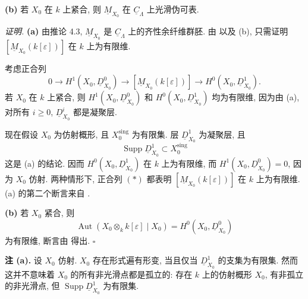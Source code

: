 \smallskip
\noindent\textbf{(b)}
若 $X_0$ 在 $k$ 上紧合, 则 $\underline M_{X_0}$ 在 $\underline C_\Lambda$ 上光滑伪可表.


\medskip
\noindent\textit{证明.}
\textbf{(a)} 由推论 4.3, $\underline M_{X_0}$ 是 $\underline C_\Lambda$ 上的齐性余纤维群胚. 由  以及 (b), 只需证明 $[\underline M_{X_0}(k[\varepsilon])]$ 在 $k$ 上为有限维.

考虑正合列
\begin{equation}\tag{*}
0\longrightarrow H^1(X_0,\underline D^0_{X_0})
\longrightarrow[\underline M_{X_0}(k[\varepsilon])]
\longrightarrow H^0(X_0,\underline D^1_{X_0}).
\end{equation}
若 $X_0$ 在 $k$ 上紧合, 则 $H^1(X_0,\underline D^0_{X_0})$ 和 $H^0(X_0,\underline D^1_{X_0})$ 均为有限维, 因为由 (a), 对所有 $i\geq0$, $\underline D^i_{X_0}$ 都是凝聚层.

现在假设 $X_0$ 为仿射概形, 且 $X_0^{\mathrm{sing}}$ 为有限集. 层 $\underline D^1_{X_0}$ 为凝聚层, 且
\[
\operatorname{Supp}\underline D^1_{X_0}
\subset X_0^{\mathrm{sing}}
\]
这是 (a) 的结论. 因而 $H^0(X_0,\underline D^1_{X_0})$ 在 $k$ 上为有限维, 而 $H^1(X_0,\underline D^0_{X_0})=0$, 因为 $X_0$ 仿射. 两种情形下, 正合列 $(*)$ 都表明 $[\underline M_{X_0}(k[\varepsilon])]$ 在 $k$ 上为有限维. (a) 的第二个断言来自 .

\smallskip
\noindent\textbf{(b)} 若 $X_0$ 紧合, 则
\[
\operatorname{Aut}(X_0\otimes_k k[\varepsilon]\mid X_0)
=H^0(X_0,\underline D^0_{X_0})
\]
为有限维, 断言由  得出.
\hfill$\square$



\medskip
\noindent\textbf{注 (a).}
设 $X_0$ 仿射. $X_0$ 存在形式遍有形变, 当且仅当 $\underline D^1_{X_0}$ 的支集为有限集. 然而这并不意味着 $X_0$ 的所有非光滑点都是孤立的: 存在 $k$ 上的仿射概形 $X_0$, 有非孤立的非光滑点, 但 $\operatorname{Supp}\underline D^1_{X_0}$ 为有限集.

